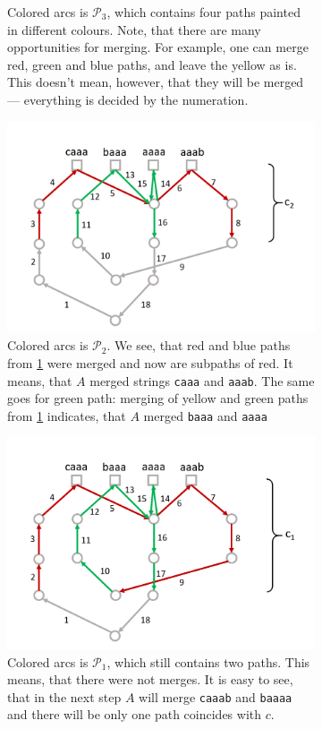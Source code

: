 \documentclass[11pt]{article}
\begin{document}
\begin{figure}[h]
\begin{subfigure}[t]{0.45\textwidth}
			\caption{Colored arcs is $\mathcal{P}_3$, which contains four paths painted in different colours. Note, that there are many opportunities for merging. For example, one can merge red, green and blue paths, and leave the yellow as is. This doesn't mean, however, that they will be merged --- everything is decided by the numeration.}
			\label{fig:1b}
		\end{subfigure}

		\begin{subfigure}[t]{0.45\textwidth}
			\includegraphics[width=\textwidth]{gha_is_greedy_img/fig3.png}
			\caption{Colored arcs is $\mathcal{P}_2$. We see, that red and blue paths from \ref{fig:1b} were merged and now are subpaths of red. It means, that $A$ merged strings {\tt caaa} and {\tt aaab}. The same goes for green path: merging of yellow and green paths from \ref{fig:1b} indicates, that $A$ merged {\tt baaa} and {\tt aaaa}}
			\label{fig:1c}
		\end{subfigure}
		\hfil
		\begin{subfigure}[t]{0.45\textwidth}
			\includegraphics[width=\textwidth]{gha_is_greedy_img/fig4.png}
			\caption{Colored arcs is $\mathcal{P}_1$, which still contains two paths. This means, that there were not merges. It is easy to see, that in the next step $A$ will merge {\tt caaab} and {\tt baaaa} and there will be only one path coincides with $c$.}
			\label{fig:1d}
		\end{subfigure}
	\caption{}
	\end{figure}
	
\end{document}
